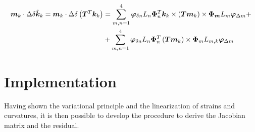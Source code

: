 \begin{equation}
\begin{split}
\bm{m}_k \cdot \Delta \delta \tilde{\bm{k}}_k =
\bm{m}_k \cdot \Delta \delta \left( \bm{T}^T \bm{k}_k \right) & =
\sum_{m,n=1}^{4} \bm{\varphi}_{\delta n} L_n \bm{\Phi}_n^T \bm{k}_k \times \left( \bm{T} \bm{m}_k \right) \times \bm{\Phi_{m}} L_m \bm{\varphi}_{\Delta m} + \\
&+\sum_{m,n=1}^{4} \bm{\varphi}_{\delta n} L_n \bm{\Phi}_n^T \left( \bm{T} \bm{m}_k \right) \times \bm{\Phi}_m L_{m,k} \bm{\varphi}_{\Delta m}
\end{split}
\label{eq:Deltadelta_k}
\end{equation}
\section{Implementation}
Having shown the variational principle and the linearization of strains and curvatures, it is then possible to develop the procedure to derive the Jacobian matrix and the residual.
